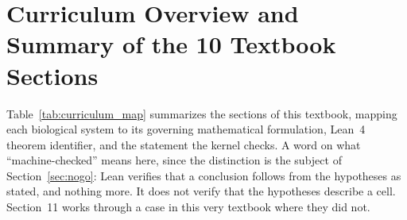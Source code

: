 \documentclass[11pt,a4paper]{article}
\theoremstyle{definition}
\theoremstyle{remark}
\begin{document}
\tableofcontents
\newpage

\section*{Curriculum Overview and Summary of the 10 Textbook Sections}

Table~\ref{tab:curriculum_map} summarizes the sections of this textbook, mapping each biological system to its governing mathematical formulation, Lean~4 theorem identifier, and the statement the kernel checks. A word on what ``machine-checked'' means here, since the distinction is the subject of Section~\ref{sec:nogo}: Lean verifies that a conclusion follows from the hypotheses as stated, and nothing more. It does not verify that the hypotheses describe a cell. Section~11 works through a case in this very textbook where they did not.
\end{document}
